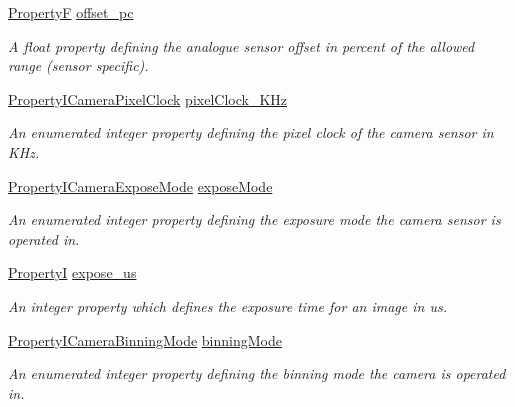\begin{DoxyCompactItemize}
\hyperlink{group___common_interface_gaf54865fe5a3d5cfd15f9a111b40d09f9}{Property\+F} \hyperlink{classmv_i_m_p_a_c_t_1_1acquire_1_1_camera_settings_blue_device_aa3bbc947f98f3182b8bd0121a511b1c2}{offset\+\_\+pc}
\begin{DoxyCompactList}\small\item\em A float property defining the analogue sensor offset in percent of the allowed range (sensor specific). \end{DoxyCompactList}\item 
\hyperlink{group___device_specific_interface_ga346a75ab93c8255ce16833b47718680d}{Property\+I\+Camera\+Pixel\+Clock} \hyperlink{classmv_i_m_p_a_c_t_1_1acquire_1_1_camera_settings_blue_device_a39df2b304078d58d4031ee2b00d9b7c3}{pixel\+Clock\+\_\+\+K\+Hz}
\begin{DoxyCompactList}\small\item\em An enumerated integer property defining the pixel clock of the camera sensor in K\+Hz. \end{DoxyCompactList}\item 
\hyperlink{group___device_specific_interface_ga1b37c202f78d874f5a68bfd7555ea552}{Property\+I\+Camera\+Expose\+Mode} \hyperlink{classmv_i_m_p_a_c_t_1_1acquire_1_1_camera_settings_blue_device_ac41f734868b019f40aad28839554c79a}{expose\+Mode}
\begin{DoxyCompactList}\small\item\em An enumerated integer property defining the exposure mode the camera sensor is operated in. \end{DoxyCompactList}\item 
\hyperlink{group___common_interface_ga12d5e434238ca242a1ba4c6c3ea45780}{Property\+I} \hyperlink{classmv_i_m_p_a_c_t_1_1acquire_1_1_camera_settings_blue_device_ab802a564f56c021c4730899f1d8c1cba}{expose\+\_\+us}
\begin{DoxyCompactList}\small\item\em An integer property which defines the exposure time for an image in us. \end{DoxyCompactList}\item 
\hyperlink{group___device_specific_interface_ga416d63b8d5d2dd2e5fabd253db5f8efc}{Property\+I\+Camera\+Binning\+Mode} \hyperlink{classmv_i_m_p_a_c_t_1_1acquire_1_1_camera_settings_blue_device_a6dc3cb5b21c3b9b6ebba4039a601b982}{binning\+Mode}
\begin{DoxyCompactList}\small\item\em An enumerated integer property defining the binning mode the camera is operated in. \end{DoxyCompactList}\item 

\end{DoxyCompactItemize}
